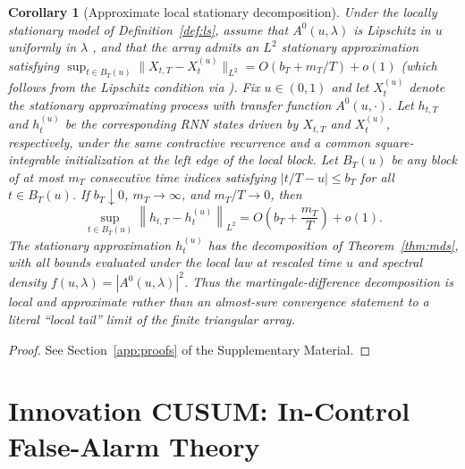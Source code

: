\documentclass[bj,authoryear]{imsart}
\theoremstyle{plain}
\newtheorem{corollary}[theorem]{Corollary}
\theoremstyle{definition}
\newcommand{\norm}[1]{\left\lVert #1 \right\rVert}
\begin{document}
\begin{corollary}[Approximate local stationary decomposition]
\label{cor:ls}
  Under the locally stationary model of Definition~\ref{def:ls}, assume that
  $A^0(u,\lambda)$ is Lipschitz in $u$ uniformly in $\lambda$
  \citep[Assumption~2]{dahlhaus1997fitting}, and that the array admits an
  $L^2$ stationary approximation satisfying
  $\sup_{t\in B_T(u)}\|X_{t,T}-X_t^{(u)}\|_{L^2}=O(b_T+m_T/T)+o(1)$
  (which follows from the Lipschitz condition via \citealt{dahlhaus1997fitting}).
  Fix $u\in(0,1)$ and let
  $X_t^{(u)}$ denote the stationary approximating process with transfer
  function $A^0(u,\cdot)$.  Let $h_{t,T}$ and $h_t^{(u)}$ be the corresponding
  RNN states driven by $X_{t,T}$ and $X_t^{(u)}$, respectively, under the same
  contractive recurrence and a common square-integrable initialization at the
  left edge of the local block.  Let $B_T(u)$ be any block of at most $m_T$
  consecutive time indices satisfying $|t/T-u|\leq b_T$ for all
  $t\in B_T(u)$.  If $b_T\downarrow0$, $m_T\to\infty$, and $m_T/T\to0$, then
  \begin{equation}
    \sup_{t\in B_T(u)}\norm{h_{t,T}-h_t^{(u)}}_{L^2}
    =O\!\left(b_T+\frac{m_T}{T}\right)+o(1).
    \label{eq:local-approx-bound}
  \end{equation}
  The stationary approximation $h_t^{(u)}$ has the decomposition of
  Theorem~\ref{thm:mds}, with all bounds evaluated under the local law at
  rescaled time $u$ and spectral density $f(u,\lambda)=|A^0(u,\lambda)|^2$.
  Thus the martingale-difference decomposition is local and approximate rather
  than an almost-sure convergence statement to a literal ``local tail'' limit
  of the finite triangular array.
\end{corollary}

\begin{proof}
  See Section~\ref{app:proofs} of the Supplementary Material.
\end{proof}


\section{Innovation CUSUM: In-Control False-Alarm Theory}
\label{sec:pathway}
\end{document}
